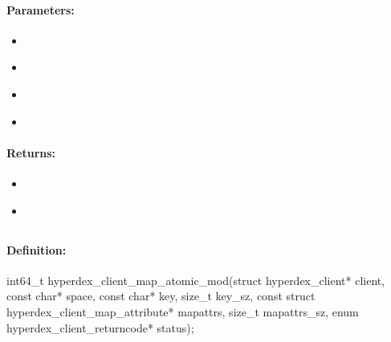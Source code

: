 \paragraph{Parameters:}
\begin{itemize}[noitemsep]
\item {}\\

\item {}\\

\item {}\\

\item {}\\

\end{itemize}

\paragraph{Returns:}
\begin{itemize}[noitemsep]
\item {}\\

\item {}\\

\end{itemize}

\pagebreak
\subsection{}
\label{api:c:map_atomic_mod}


\paragraph{Definition:}
\begin{ccode}
int64_t hyperdex_client_map_atomic_mod(struct hyperdex_client* client,
        const char* space,
        const char* key, size_t key_sz,
        const struct hyperdex_client_map_attribute* mapattrs, size_t mapattrs_sz,
        enum hyperdex_client_returncode* status);
\end{ccode}

